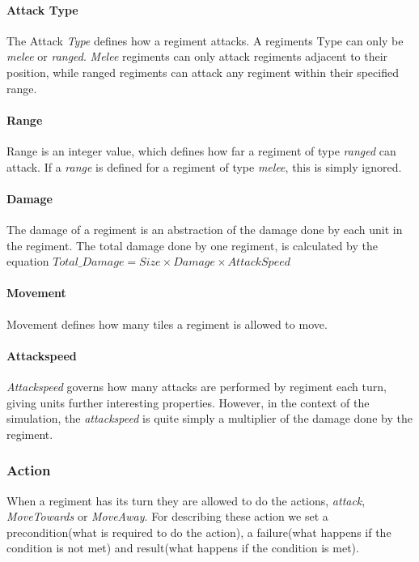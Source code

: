 		\paragraph{Attack Type}
		The Attack \textit{Type} defines how a regiment attacks. A regiments Type can only be \textit{melee} or \textit{ranged}.
		\textit{Melee} regiments can only attack regiments adjacent to their position, while ranged regiments 
		can attack any regiment within their specified range.
		
		\paragraph{Range}
		Range is an integer value, which defines how far a regiment of type \textit{ranged} can attack. 
		If a \textit{range} is defined for a regiment of type \textit{melee}, this is simply ignored.
		
		\paragraph{Damage}
		The damage of a regiment is an abstraction of the damage done by each unit in the regiment.
		The total damage done by one regiment, is calculated by the equation\label{Total_Damage} $Total\_Damage = Size \times Damage \times AttackSpeed$ 
		
		\paragraph{Movement}
		Movement defines how many tiles a regiment is allowed to move.
		
		\paragraph{Attackspeed}
		\textit{Attackspeed} governs how many attacks are performed by regiment each turn, giving units further interesting properties. 
		However, in the context of the simulation, the \textit{attackspeed} is quite simply a multiplier of the damage done by the regiment.
		
		\subsubsection{Action}
		\label{rules:action}
		When a regiment has its turn they are allowed to do the actions, \textit{attack}, \textit{MoveTowards} or \textit{MoveAway}.
		For describing these action we set a precondition(what is required to do the action), a failure(what happens if the condition is not met)
		and result(what happens if the condition is met).
		
